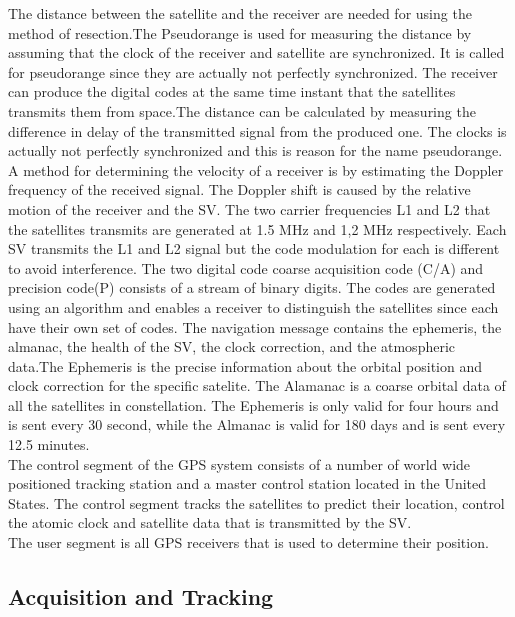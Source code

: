  The distance between the satellite and the receiver are needed for using the method of resection.The Pseudorange is used for measuring the distance by assuming that the clock of the receiver and satellite are synchronized. It is called for pseudorange since they are actually not perfectly synchronized. The receiver can produce the digital codes at the same time instant that the satellites transmits them from space.The distance can be calculated by measuring the difference in delay of the transmitted signal from the produced one. The clocks is actually not perfectly synchronized and this is reason for the name pseudorange. \\
 A method for determining the velocity of a receiver is by estimating the Doppler frequency of the received signal. The Doppler shift is caused by the relative motion of the receiver and the SV. The two carrier frequencies L1 and L2 that the satellites transmits are generated at 1.5 MHz and 1,2 MHz respectively.  Each SV transmits the L1 and L2 signal but the code modulation for each is different to avoid interference. The two digital code coarse acquisition code (C/A) and precision code(P) consists of a stream of binary digits. The codes are generated using an algorithm and enables a receiver to distinguish the satellites since each have their own set of codes. The navigation message contains the ephemeris, the almanac, the health of the SV, the clock correction, and the atmospheric data.The Ephemeris is the precise information about the orbital position and clock correction for the specific satelite. The Alamanac is a coarse orbital data of all the satellites in constellation. The Ephemeris is only valid for four hours and is sent every 30  second, while the Almanac is valid for 180 days and is sent every 12.5 minutes. \\
 The control segment of the GPS system consists of a number of world wide positioned tracking station and a master control station located in the United States. The control segment tracks the satellites to predict their location, control the atomic clock and satellite data that is transmitted by the SV. \\ The user segment is all GPS receivers that is used to determine their position.
  
  
  \subsection{Acquisition and Tracking}
  
